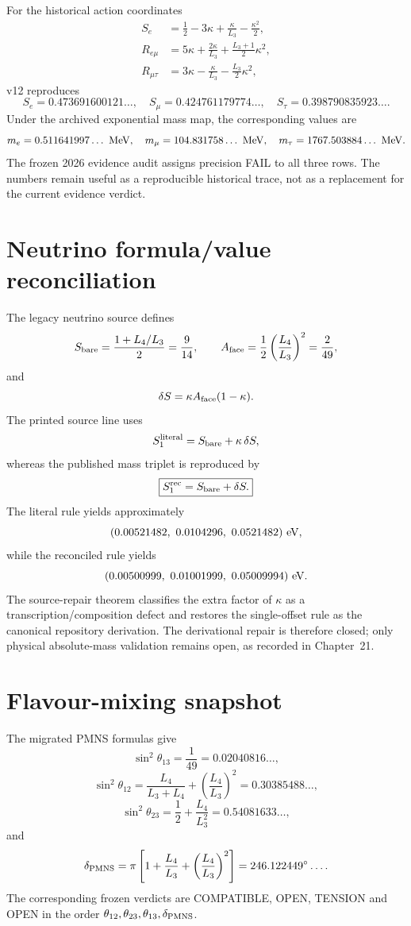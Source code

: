 For the historical action coordinates
\[
\begin{aligned}
S_e&=\frac12-3\kappa+\frac{\kappa}{L_3}-\frac{\kappa^2}{2},\\
R_{e\mu}&=5\kappa+\frac{2\kappa}{L_3}
+\frac{L_3+1}{2}\kappa^2,\\
R_{\mu\tau}&=3\kappa-\frac{\kappa}{L_3}
-\frac{L_3}{2}\kappa^2,
\end{aligned}
\]
v12 reproduces
\[
S_e=0.473691600121\ldots,\quad
S_\mu=0.424761179774\ldots,\quad
S_\tau=0.398790835923\ldots .
\]
Under the archived exponential mass map, the corresponding values are
\[
m_e=0.511641997\ldots\ {\rm MeV},
\quad
m_\mu=104.831758\ldots\ {\rm MeV},
\quad
m_\tau=1767.503884\ldots\ {\rm MeV}.
\]
The frozen 2026 evidence audit assigns precision FAIL to all three rows.  The
numbers remain useful as a reproducible historical trace, not as a replacement
for the current evidence verdict.

\section{Neutrino formula/value reconciliation}

The legacy neutrino source defines
\[
S_{\rm bare}=\frac{1+L_4/L_3}{2}=\frac9{14},
\qquad
A_{\rm face}=\frac12\left(\frac{L_4}{L_3}\right)^2=\frac2{49},
\]
and
\[
\delta S=\kappa A_{\rm face}(1-\kappa).
\]
The printed source line uses
\[
S_1^{\rm literal}=S_{\rm bare}+\kappa\,\delta S,
\]
whereas the published mass triplet is reproduced by
\[
\boxed{
S_1^{\rm rec}=S_{\rm bare}+\delta S.
}
\]
The literal rule yields approximately
\[
(0.00521482,\ 0.0104296,\ 0.0521482)\ {\rm eV},
\]
while the reconciled rule yields
\[
(0.00500999,\ 0.01001999,\ 0.05009994)\ {\rm eV}.
\]
The source-repair theorem classifies the extra factor of $\kappa$ as a transcription/composition defect and restores the single-offset rule as the canonical repository derivation. The derivational repair is therefore closed; only physical absolute-mass validation remains open, as recorded in Chapter~21.

\section{Flavour-mixing snapshot}

The migrated PMNS formulas give
\[
\sin^2\theta_{13}=\frac1{49}=0.02040816\ldots,
\]
\[
\sin^2\theta_{12}
=\frac{L_4}{L_3+L_4}
+\left(\frac{L_4}{L_3}\right)^2
=0.30385488\ldots,
\]
\[
\sin^2\theta_{23}
=\frac12+\frac{L_4}{L_3^2}
=0.54081633\ldots,
\]
and
\[
\delta_{\rm PMNS}
=\pi\left[
1+\frac{L_4}{L_3}
+\left(\frac{L_4}{L_3}\right)^2
\right]
=246.122449^\circ\ldots .
\]
The corresponding frozen verdicts are COMPATIBLE, OPEN, TENSION and OPEN in the
order \(\theta_{12},\theta_{23},\theta_{13},\delta_{\rm PMNS}\).


